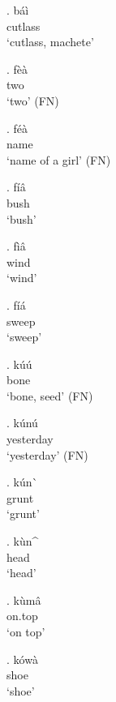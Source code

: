 \documentclass{assets/fieldnotes}
\begin{document}
\exg. b\'{a}\`{i} \\
cutlass \\
`cutlass, machete' 

\exg. f\`{e}\`{a} \\
two \\
`two' (FN)

\exg. f\'{e}\`{a} \\
name \\
`name of a girl' (FN)

\exg. f\'{i}\^{a} \\
bush \\
`bush'

\exg. f\`{i}\^{a} \\
wind \\
`wind'

\exg. f\'{i}\'{a}\\
sweep \\
`sweep'

\exg. k\'{u}\'{u} \\
bone \\
`bone, seed' (FN)

\exg. k\'{u}n\'{u} \\
yesterday \\
`yesterday' (FN)

\exg. k\'{u}n\`{} \\
grunt \\
`grunt'

\exg. k\`{u}n\^{} \\
head \\
`head'

\exg. k\`{u}m\^{a} \\
on.top \\
`on top'

\exg. k\'{o}w\`{a} \\
shoe \\
`shoe'

\newpage 
\end{document}
